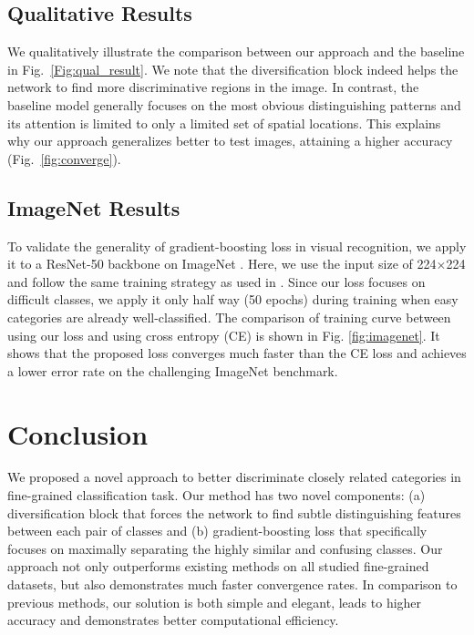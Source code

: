 \documentclass[letterpaper]{article} \usepackage{aaai20}  \usepackage{times}  \usepackage{helvet} \usepackage{courier}  \usepackage[hyphens]{url}  \usepackage{graphicx} \usepackage{multirow}
\begin{document}
\subsection{Qualitative Results}
We qualitatively illustrate the comparison between our approach and the baseline in Fig.~\ref{Fig:qual_result}. We note that the diversification block indeed helps the network to find more discriminative regions in the image. In contrast, the baseline model generally focuses on the most obvious distinguishing patterns and its attention is limited to only a limited set of spatial locations. This explains why our approach generalizes better to test images, attaining a higher accuracy (Fig.~\ref{fig:converge}). 


\subsection{ImageNet Results}
To validate the generality of gradient-boosting loss in visual recognition, we apply it to a ResNet-50 backbone on ImageNet \cite{ILSVRC15}. Here, we use the input size of 224$\times$224 and follow the same training strategy as used in \cite{resnet_2016}. Since our loss focuses on difficult classes, we apply it only half way (50 epochs) during training when easy categories are already well-classified. The comparison of training curve between using our loss and using cross entropy (CE) is shown in Fig. \ref{fig:imagenet}. It shows that the proposed loss converges much faster than the CE loss and achieves a lower error rate on the challenging ImageNet benchmark. 

\section{Conclusion}
We proposed a novel approach to better discriminate closely related categories in fine-grained classification task. Our method has two novel components: (a) diversification block that forces the network to find subtle distinguishing features between each pair of classes and (b) gradient-boosting loss that specifically focuses on maximally separating the highly similar and confusing classes. Our approach not only outperforms existing methods on all studied fine-grained datasets, but also demonstrates much faster convergence rates. In comparison to previous methods, our solution is both simple and elegant, leads to higher accuracy and demonstrates better computational efficiency. 



\end{document}
